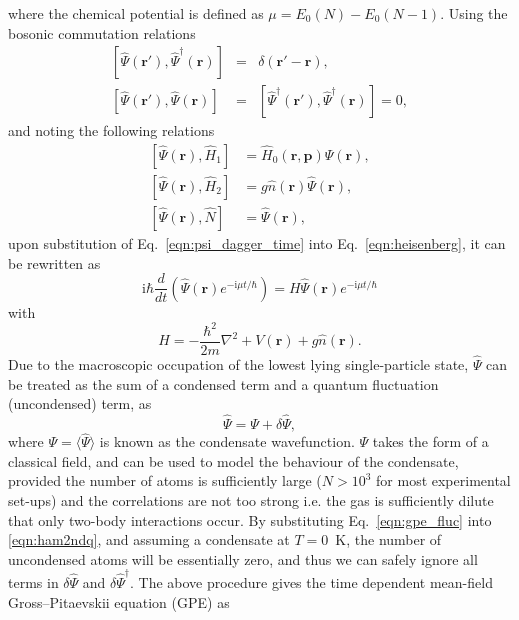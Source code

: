 where the chemical potential is defined as $\mu=E_0(N) - E_0(N-1)$. Using the bosonic commutation relations
\begin{eqnarray}
\left[\hat{\Psi}(\mathbf{r}'), \hat{\Psi}^{\dagger}(\mathbf{r})\right] &=& \delta(\mathbf{r}' - \mathbf{r}), \\
\left[\hat{\Psi}(\mathbf{r}'), \hat{\Psi}(\mathbf{r})\right] &=& \left[\hat{\Psi}^{\dagger}(\mathbf{r}'), \hat{\Psi}^{\dagger}(\mathbf{r})\right] = 0,
\end{eqnarray}
and noting the following relations
\begin{align}
\left[\hat{\Psi}(\mathbf{r}),\hat{H}_1 \right] & = \hat{H}_0(\mathbf{r},\mathbf{p})\hat{\Psi}(\mathbf{r}), \\
\left[\hat{\Psi}(\mathbf{r}),\hat{H}_2 \right] & = g\hat{n}(\textbf{r})\hat{\Psi}(\mathbf{r}), \\
\left[\hat{\Psi}(\mathbf{r}),\hat{N} \right] & = \hat{\Psi}(\textbf{r}) ,
\end{align}
upon substitution of Eq.~\eqref{eqn:psi_dagger_time} into Eq.~\eqref{eqn:heisenberg}, it can be rewritten as
\begin{equation}\label{eqn:almost_gpe}
    \textrm{i} \hbar \frac{d}{d t} \left( \hat{\Psi}(\mathbf{r}) e^{-{\textrm{i}\mu t / \hbar}} \right) = H \hat{\Psi}(\mathbf{r}) e^{-{\textrm{i}\mu t / \hbar}}
\end{equation}
with
\begin{equation}\label{eqn:h_many}
H =  -\frac{\hbar^2}{2m}\nabla^2  + V(\mathbf{r}) + g\hat{n}(\mathbf{r}).
\end{equation}
Due to the macroscopic occupation of the lowest lying single-particle state, $\hat{\Psi}$ can be treated as the sum of a condensed term and a quantum fluctuation (uncondensed) term, as
\begin{equation}\label{eqn:gpe_fluc}
    \hat{\Psi} = \Psi + \delta\hat{\Psi},
\end{equation}
where $\Psi = \langle \hat{\Psi} \rangle$ is known as the condensate wavefunction. $\Psi$ takes the form of a classical field, and can be used to model the behaviour of the condensate, provided the number of atoms is sufficiently large ($N>10^3$ for most experimental set-ups) and the correlations are not too strong i.e. the gas is sufficiently dilute that only two-body interactions occur. By substituting Eq.~\eqref{eqn:gpe_fluc} into \eqref{eqn:ham2ndq}, and assuming a condensate at $T=0$~K, the number of uncondensed atoms will be essentially zero, and thus we can safely ignore all terms in $\delta\hat{\Psi}$ and $\delta\hat{\Psi}^{\dagger}$. The above procedure gives the time dependent mean-field Gross--Pitaevskii equation (GPE) as
